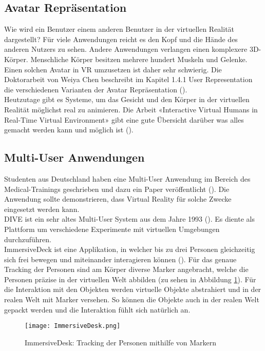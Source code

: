 \subsection{Avatar Repräsentation}
\label{ch:avatar_repraesentation}

Wie wird ein Benutzer einem anderen Benutzer in der virtuellen Realität dargestellt? 
Für viele Anwendungen reicht es den Kopf und die Hände des anderen Nutzers zu sehen. Andere Anwendungen verlangen einen komplexere 3D-Körper. Menschliche Körper besitzen mehrere hundert Muskeln und Gelenke. Einen solchen Avatar in VR umzusetzen ist daher sehr schwierig. Die Doktorarbeit von Weiya Chen beschreibt im Kapitel 1.4.1 User Representation die verschiedenen Varianten der Avatar Repräsentation (\cite{chen_collaboration_2015}). \\

\noindent Heutzutage gibt es Systeme, um das Gesicht und den Körper in der virtuellen Realität möglichst real zu animieren. Die Arbeit «Interactive Virtual Humans in Real-Time Virtual Environment» gibt eine gute Übersicht darüber was alles gemacht werden kann und möglich ist (\cite{magnenat-thalmann_interactive_2015}). 

\subsection{Multi-User Anwendungen}

Studenten aus Deutschland haben eine Multi-User Anwendung im Bereich des Medical-Trainings geschrieben und dazu ein Paper veröffentlicht (\cite{schild_applying_2018}). Die Anwendung sollte demonstrieren, dass Virtual Reality für solche Zwecke eingesetzt werden kann. \\

\noindent DIVE ist ein sehr altes Multi-User System aus dem Jahre 1993 (\cite{carlsson_dive_1993}). Es diente als Plattform um verschiedene Experimente mit virtuellen Umgebungen durchzuführen. \\

\noindent ImmersiveDeck ist eine Applikation, in welcher bis zu drei Personen gleichzeitig sich frei bewegen und miteinander interagieren können (\cite{podkosova_immersivedeck:_2016}). Für das genaue Tracking der Personen sind am Körper diverse Marker angebracht, welche die Personen präzise in der virtuellen Welt abbilden (zu sehen in Abbildung \ref{fig:immersivedesk}). Für die Interaktion mit den Objekten werden virtuelle Objekte abstrahiert und in der realen Welt mit Marker versehen. So können die Objekte auch in der realen Welt gepackt werden und die Interaktion fühlt sich natürlich an.

\begin{figure}[h!]
	\centering
	\texttt{[image: ImmersiveDesk.png]}
	\caption{ImmersiveDesk: Tracking der Personen mithilfe von Markern}
	\label{fig:immersivedesk}
\end{figure} 

